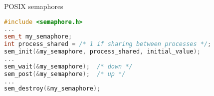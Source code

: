 \begin{frame}[fragile,label=posixSemaphores]{POSIX semaphores}
\begin{lstlisting}[language=C++,style=small]
#include <semaphore.h>
...
sem_t my_semaphore;
int process_shared = /* 1 if sharing between processes */;
sem_init(&my_semaphore, process_shared, initial_value);
...
sem_wait(&my_semaphore);  /* down */
sem_post(&my_semaphore);  /* up */
...
sem_destroy(&my_semaphore);
\end{lstlisting}
\end{frame}

